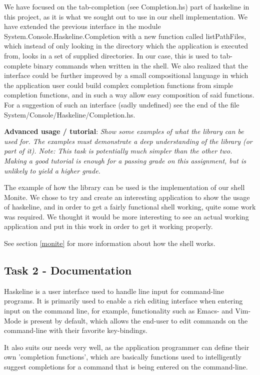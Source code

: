 \documentclass[11pt,a4paper]{article}
\begin{document}
We have focused on the tab-completion (see Completion.hs) part of haskeline in
this project, as it is what we sought out to use in our shell implementation. We
have extended the previous interface in the module
System.Console.Haskeline.Completion with a new function called listPathFiles,
which instead of only looking in the directory which the application is executed
from, looks in a set of supplied directories. In our case, this is used to
tab-complete binary commands when written in the shell. We also realized that
the interface could be further improved by a small compositional language in
which the application user could build complex completion functions from simple
completion functions, and in such a way allow easy composition of said
functions. For a suggestion of such an interface (sadly undefined) see the end
of the file System/Console/Haskeline/Completion.hs.

\textbf{Advanced usage / tutorial}: \textit{Show some examples of what the library can be used
for. The examples must demonstrate a deep understanding of the library (or part
of it). Note: This task is potentially much simpler than the other two. Making a
good tutorial is enough for a passing grade on this assignment, but is unlikely
to yield a higher grade.}

The example of how the library can be used is the implementation of our shell
Monite. We chose to try and create an interesting application to show the usage
of haskeline, and in order to get a fairly functional shell working, quite some
work was required. We thought it would be more interesting to see an actual
working application and put in this work in order to get it working properly.

See section \ref{monite} for more information about how the shell works.

\subsection{Task 2 - Documentation}
Haskeline is a user interface used to handle line input for command-line
programs. It is primarily used to enable a rich editing interface when entering
input on the command line, for example, functionality such as Emacs- and
Vim-Mode is present by default, which allows the end-user to edit commands on
the command-line with their favorite key-bindings.

It also suits our needs very well, as the application programmer can define
their own 'completion functions', which are basically functions used to
intelligently suggest completions for a command that is being entered on the
command-line.
\end{document}
